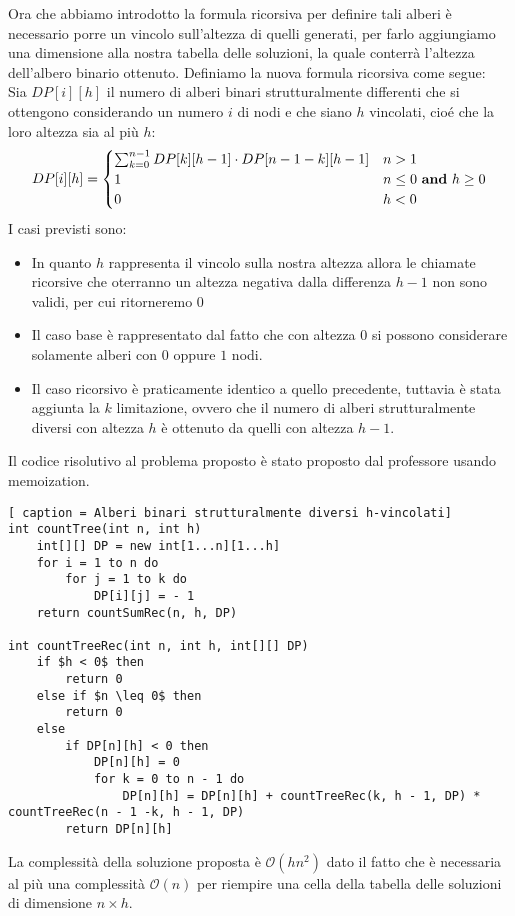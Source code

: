 \documentclass[../cheatSheetAlgoritmi.tex]{subfiles}
\begin{document}
Ora che abbiamo introdotto la formula ricorsiva per definire tali alberi è necessario porre un vincolo sull'altezza di quelli generati, per farlo aggiungiamo una dimensione alla nostra tabella delle soluzioni, la quale conterrà l'altezza dell'albero binario ottenuto. Definiamo la nuova formula ricorsiva come segue: \\
Sia $DP[i][h]$ il numero di alberi binari strutturalmente differenti che si ottengono considerando un numero $i$ di nodi e che siano $h$ vincolati, cioé che la loro altezza sia al più $h$: 
\begin{equation*}
  	DP[i][h] =\begin{cases}
    	\sum_{k = 0}^{n - 1} DP[k][h - 1] \cdot DP[n - 1 - k][h - 1] & \text{$n > 1$}\\
    	1 & \text{$n \leq 0$ \textbf{and} $h \geq 0$} \\
    	0 & \text{$h < 0$}
  	\end{cases}
\end{equation*}
I casi previsti sono: 
\begin{itemize}
	\item In quanto $h$ rappresenta il vincolo sulla nostra altezza allora le chiamate ricorsive che oterranno un altezza negativa dalla differenza $h-1$ non sono validi, per cui ritorneremo $0$
	\item Il caso base è rappresentato dal fatto che con altezza $0$ si possono considerare solamente alberi con $0$ oppure $1$ nodi.
	\item Il caso ricorsivo è praticamente identico a quello precedente, tuttavia è stata aggiunta la $k$ limitazione, ovvero che il numero di alberi strutturalmente diversi con altezza $h$ è ottenuto da quelli con altezza $h - 1$.
\end{itemize}
Il codice risolutivo al problema proposto è stato proposto dal professore usando memoization. 
\begin{lstlisting}[ caption = Alberi binari strutturalmente diversi h-vincolati]
int countTree(int n, int h)
	int[][] DP = new int[1...n][1...h]
	for i = 1 to n do
		for j = 1 to k do
			DP[i][j] = - 1
	return countSumRec(n, h, DP)

int countTreeRec(int n, int h, int[][] DP)
	if $h < 0$ then
		return 0
	else if $n \leq 0$ then
		return 0
	else 
		if DP[n][h] < 0 then
			DP[n][h] = 0
			for k = 0 to n - 1 do
				DP[n][h] = DP[n][h] + countTreeRec(k, h - 1, DP) * countTreeRec(n - 1 -k, h - 1, DP)
		return DP[n][h]
\end{lstlisting}
La complessità della soluzione proposta è $\mathcal{O}(hn^2)$ dato il fatto che è necessaria al più una complessità $\mathcal{O}(n)$ per riempire una cella della tabella delle soluzioni di dimensione $n \times h$.
\end{document}
